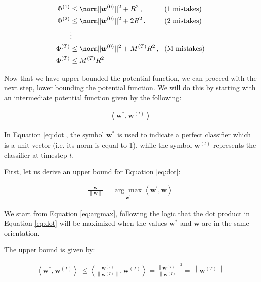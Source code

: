 \documentclass[11pt]{article}
\begin{document}
\begin{align}
  \Phi^{(1)} &\le  \norm ||{ \pmb{w} ^ {(0)} }||^{2} + R^2 \,, \,\,\,\,\,\,\,\,\,\,\,\,\,\,\,\,\,\, \text{(1 mistakes)} \\
  \Phi^{(2)} &\le  \norm ||{ \pmb{w} ^ {(0)} }||^{2} + 2R^2 \,, \,\,\,\,\,\,\,\,\,\,\,\,\,\,\, \text{(2 mistakes)}  \\
    &\vdots \\
  \Phi^{(T)} &\le  \norm ||{ \pmb{w} ^ {(0)} }||^{2} + M^{(T)}R^2 \, , \,\,\,\, \text{(M mistakes)} \\
  \Phi^{(T)} &\le  M^{(T)}R^2 \label{eq:potential_upper2}
\end{align}

Now that we have upper bounded the potential function, we can proceed with the next step, lower bounding the potential function. We will do this by starting with an intermediate potential function given by the following:

\begin{align}
    \left\langle\boldsymbol{w}^{*}, \boldsymbol{w}^{(t)}\right\rangle
    \label{eq:dot}
\end{align}

In Equation \ref{eq:dot}, the symbol $\boldsymbol{w}^{*}$ is used to indicate a perfect classifier which is a unit vector (i.e. its norm is equal to 1), while the symbol $\boldsymbol{w}^{(t)}$ represents the classifier at timestep $t$. 

First, let us derive an upper bound for Equation \ref{eq:dot}:

\begin{align}
    \frac{\boldsymbol{w}}{\|\boldsymbol{w}\|}=\underset{\boldsymbol{w}^{\prime}}{\arg \max }\left\langle\boldsymbol{w}^{\prime},     \boldsymbol{w}\right\rangle
    \label{eq:argmax}
\end{align}

We start from Equation \ref{eq:argmax}, following the logic that the dot product in Equation \ref{eq:dot} will be maximized when the values $\boldsymbol{w}^{*}$ and $\boldsymbol{w}$ are in the same orientation. 

The upper bound is given by:

\begin{align}
    \left\langle\boldsymbol{w}^{*}, \boldsymbol{w}^{(T)}\right\rangle \ \leq\left\langle\frac{\boldsymbol{w}^{(T)}}{\left\|\boldsymbol{w}^{(T)}\right\|}, \boldsymbol{w}^{(T)}\right\rangle=\frac{\left\|\boldsymbol{w}^{(T)}\right\|^{2}}{\left\|\boldsymbol{w}^{(T)}\right\|}=\left\|\boldsymbol{w}^{(T)}\right\|
    \label{eq:upperbound}
\end{align}
\end{document}
